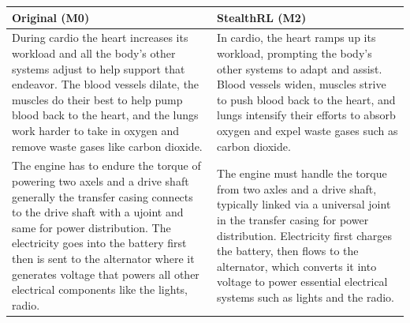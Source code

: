 \documentclass[11pt]{article}
\begin{document}
\begin{center}
\footnotesize
\setlength{\tabcolsep}{4pt}
\begin{tabularx}{\columnwidth}{>{\raggedright\arraybackslash}X >{\raggedright\arraybackslash}X}
\toprule
\textbf{Original (M0)} & \textbf{StealthRL (M2)} \\
\midrule
During cardio the heart increases its workload and all the body's other systems adjust to help support that endeavor. The blood vessels dilate, the muscles do their best to help pump blood back to the heart, and the lungs work harder to take in oxygen and remove waste gases like carbon dioxide. &
In cardio, the heart ramps up its workload, prompting the body's other systems to adapt and assist. Blood vessels widen, muscles strive to push blood back to the heart, and lungs intensify their efforts to absorb oxygen and expel waste gases such as carbon dioxide. \\
\midrule
The engine has to endure the torque of powering two axels and a drive shaft generally the transfer casing connects to the drive shaft with a ujoint and same for power distribution. The electricity goes into the battery first then is sent to the alternator where it generates voltage that powers all other electrical components like the lights, radio. &
The engine must handle the torque from two axles and a drive shaft, typically linked via a universal joint in the transfer casing for power distribution. Electricity first charges the battery, then flows to the alternator, which converts it into voltage to power essential electrical systems such as lights and the radio. \\
\bottomrule
\end{tabularx}
\label{tab:qual1}
\end{center}
\end{document}
